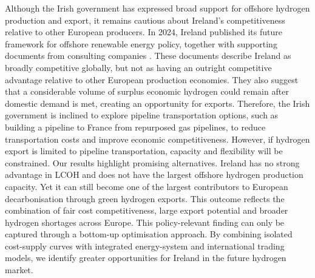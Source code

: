 \documentclass[pdflatex,sn-mathphys,Numbered]{sn-jnl}%
\begin{document}
Although the Irish government has expressed broad support for offshore hydrogen production and export, it remains cautious about Ireland's competitiveness relative to other European producers.
In 2024, Ireland published its future framework for offshore renewable energy policy, together with supporting documents from consulting companies \cite{OffshoreRenewablesSurplus}. These documents describe Ireland as broadly competitive globally, but not as having an outright competitive advantage relative to other European production economies. They also suggest that a considerable volume of surplus economic hydrogen could remain after domestic demand is met, creating an opportunity for exports. Therefore, the Irish government is inclined to explore pipeline transportation options, such as building a pipeline to France from repurposed gas pipelines, to reduce transportation costs and improve economic competitiveness. However, if hydrogen export is limited to pipeline transportation, capacity and flexibility will be constrained.
Our results highlight promising alternatives.
Ireland has no strong advantage in LCOH and does not have the largest offshore hydrogen production capacity. Yet it can still become one of the largest contributors to European decarbonisation through green hydrogen exports. This outcome reflects the combination of fair cost competitiveness, large export potential and broader hydrogen shortages across Europe.
This policy-relevant finding can only be captured through a bottom-up optimisation approach. By combining isolated cost-supply curves with integrated energy-system and international trading models, we identify greater opportunities for Ireland in the future hydrogen market.
\end{document}
